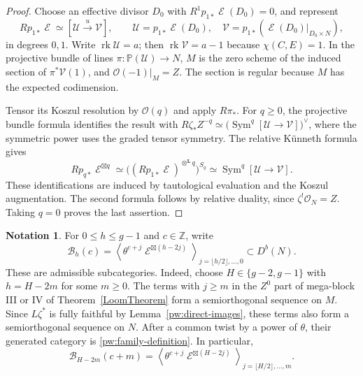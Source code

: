 \documentclass[11pt,letterpaper]{amsart}
\theoremstyle{plain}
\theoremstyle{definition}
\newtheorem{notation}[theorem]{Notation}
\theoremstyle{remark}
\numberwithin{equation}{section}
\DeclareMathOperator{\rk}{rk}
\DeclareMathOperator{\cE}{\mathcal{E}}
\begin{document}
\begin{proof}
Choose an effective divisor $D_0$ with $R^1p_{1*}\cE(D_0)=0$,
and represent
\[
 Rp_{1*}\cE\simeq[\mathcal U\xrightarrow{u}\mathcal V],\qquad
 \mathcal U=p_{1*}\cE(D_0),\quad
 \mathcal V=p_{1*}(\cE(D_0)|_{D_0\times N}),
\]
in degrees $0,1$. Write $\rk\mathcal U=a$; then
$\rk\mathcal V=a-1$ because $\chi(C,E)=1$.
In the projective bundle of lines $\pi:\mathbb P(\mathcal U)\to N$,
$M$ is the zero scheme of the induced section of
$\pi^*\mathcal V(1)$, and $\mathcal O(-1)|_M=Z$.
The section is regular because $M$ has the expected codimension.

Tensor its Koszul resolution by $\mathcal O(q)$ and apply
$R\pi_*$. For $q\ge0$, the projective bundle formula identifies the
result with
$
 R\zeta_*Z^{-q}\simeq
       \bigl(\operatorname{Sym}^q[\mathcal U\to\mathcal V]\bigr)^\vee
$,
where the symmetric power uses the graded tensor symmetry.
The relative K\"unneth formula gives
\[
 Rp_{q*}\cE^{\boxtimes q}
 \simeq\bigl((Rp_{1*}\cE)^{\otimes^{\mathbf L}q}\bigr)^{S_q}
 \simeq\operatorname{Sym}^q[\mathcal U\to\mathcal V].
\]
These identifications are induced by tautological evaluation and
the Koszul augmentation. The second formula follows by relative
duality, since $\zeta^!\mathcal O_N=Z$. Taking $q=0$ proves the
last assertion.
\end{proof}




\begin{notation}\label{pw:block-families}
For $0\leq h\leq g-1$ and $c\in\mathbb Z$, write
\begin{equation}\label{pw:family-definition}
 \mathcal B_h(c)=
 \left\langle\theta^{c+j}\cE^{\boxtimes(h-2j)}
 \right\rangle_{j=\lfloor h/2\rfloor,\ldots,0}
 \subset D^b(N).
\end{equation}
These are admissible subcategories.  Indeed, choose
$H\in\{g-2,g-1\}$ with $h=H-2m$ for some $m\geq0$.
The terms with $j\geq m$ in the $Z^0$ part of mega-block III or IV of
Theorem~\ref{LoomTheorem} form a semiorthogonal sequence on $M$.
Since $L\zeta^*$ is fully faithful by Lemma~\ref{pw:direct-images},
these terms also form a semiorthogonal sequence on $N$.
After a common twist by a power of $\theta$, their generated category
is \eqref{pw:family-definition}.  In particular,
\begin{equation}\label{pw:prefix}
 \mathcal B_{H-2m}(c+m)=
 \left\langle\theta^{c+j}\cE^{\boxtimes(H-2j)}
 \right\rangle_{j=\lfloor H/2\rfloor,\ldots,m}.
\end{equation}
\end{notation}
\end{document}
